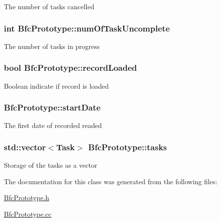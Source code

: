 The number of tasks cancelled \hypertarget{classBfcPrototype_ab506fb074e721612c0838e2c37c93e09}{
\subsubsection[{num\-Of\-Task\-Uncomplete}]{\setlength{\rightskip}{0pt plus 5cm}int Bfc\-Prototype\-::num\-Of\-Task\-Uncomplete\hspace{0.3cm}{\ttfamily [private]}}}\label{classBfcPrototype_ab506fb074e721612c0838e2c37c93e09}
The number of tasks in progress \hypertarget{classBfcPrototype_ac719ad28f80b4c8955ba516ac68471cc}{
\subsubsection[{record\-Loaded}]{\setlength{\rightskip}{0pt plus 5cm}bool Bfc\-Prototype\-::record\-Loaded\hspace{0.3cm}{\ttfamily [private]}}}\label{classBfcPrototype_ac719ad28f80b4c8955ba516ac68471cc}
Boolean indicate if record is loaded \hypertarget{classBfcPrototype_a636fde08f1c5518862f9d2603f73ebae}{
\subsubsection[{start\-Date}]{ Bfc\-Prototype\-::start\-Date\hspace{0.3cm}{\ttfamily [private]}}}\label{classBfcPrototype_a636fde08f1c5518862f9d2603f73ebae}
The first date of recorded readed \hypertarget{classBfcPrototype_a2724416668b0a82b442df12f90360e95}{
\subsubsection[{tasks}]{\setlength{\rightskip}{0pt plus 5cm}std\-::vector$<${\bf Task}$>$ Bfc\-Prototype\-::tasks\hspace{0.3cm}{\ttfamily [private]}}}\label{classBfcPrototype_a2724416668b0a82b442df12f90360e95}
Storage of the tasks as a vector 

The documentation for this class was generated from the following files\-:\begin{DoxyCompactItemize}
\item 
\hyperlink{BfcPrototype_8h}{Bfc\-Prototype.\-h}\item 
\hyperlink{BfcPrototype_8cc}{Bfc\-Prototype.\-cc}\end{DoxyCompactItemize}
